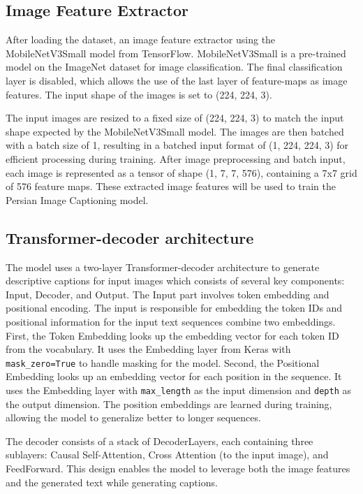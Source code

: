 \documentclass[runningheads]{llncs}
\begin{document}
\subsection{Image Feature Extractor}

After loading the dataset, an image feature extractor using the MobileNetV3Small model from TensorFlow. MobileNetV3Small is a pre-trained model on the ImageNet dataset for image classification. The final classification layer is disabled, which allows the use of the last layer of feature-maps as image features. The input shape of the images is set to (224, 224, 3).

The input images are resized to a fixed size of (224, 224, 3) to match the input shape expected by the MobileNetV3Small model. The images are then batched with a batch size of 1, resulting in a batched input format of (1, 224, 224, 3) for efficient processing during training. After image preprocessing and batch input, each image is represented as a tensor of shape (1, 7, 7, 576), containing a 7x7 grid of 576 feature maps. These extracted image features will be used to train the Persian Image Captioning model.

\subsection{Transformer-decoder architecture}

The model uses a two-layer Transformer-decoder architecture to generate descriptive captions for input images which consists of several key components: Input, Decoder, and Output. The Input part involves token embedding and positional encoding. The input is responsible for embedding the token IDs and positional information for the input text sequences combine two embeddings. First, the Token Embedding looks up the embedding vector for each token ID from the vocabulary. It uses the Embedding layer from Keras with \texttt{mask\_zero=True} to handle masking for the model. Second, the Positional Embedding looks up an embedding vector for each position in the sequence. It uses the Embedding layer with \texttt{max\_length} as the input dimension and \texttt{depth} as the output dimension. The position embeddings are learned during training, allowing the model to generalize better to longer sequences.

The decoder consists of a stack of DecoderLayers, each containing three sublayers: Causal Self-Attention, Cross Attention (to the input image), and FeedForward. This design enables the model to leverage both the image features and the generated text while generating captions.
\end{document}
